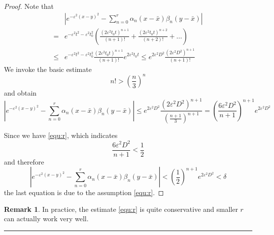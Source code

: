 \documentclass[10pt,a4paper]{article}
\theoremstyle{definition}
\newtheorem{remark}{Remark}
\begin{document}
\begin{proof}
	Note that 
	\begin{align}
		&|{e^{ - {\varepsilon ^2}{{(x - y)}^2}}} - \sum\limits_{n = 0}^r {{\alpha _n}} (x - \bar x){\beta _n}(y - \bar x)|\\
		 =&  {e^{ - {\varepsilon ^2}{t^2} - {\varepsilon ^2}t_0^2}}\left( {\frac{{{{(2{\varepsilon ^2}{t_0}t)}^{n + 1}}}}{{(n + 1)!}} + \frac{{{{(2{\varepsilon ^2}{t_0}t)}^{n + 2}}}}{{(n + 2)!}} +  \ldots } \right)\\
		\le& {e^{ - {\varepsilon ^2}{t^2} - {\varepsilon ^2}t_0^2}}\frac{{{{(2{\varepsilon ^2}{t_0}t)}^{n + 1}}}}{{(n + 1)!}}{e^{2{\varepsilon ^2}{t_0}t}} \le {e^{2{\varepsilon ^2}{D^2}}}\frac{{{{(2{\varepsilon ^2}{D^2})}^{n + 1}}}}{{(n + 1)!}}
	\end{align}
	We invoke the basic estimate
	\begin{equation}
		n!>\left( \frac{n}{3} \right)^{n}
	\end{equation} 
	and obtain
	\begin{equation}
		|{e^{ - {\varepsilon ^2}{{(x - y)}^2}}} - \sum\limits_{n = 0}^r {{\alpha _n}} (x - \bar x){\beta _n}(y - \bar x)|\leq {e^{2{\varepsilon ^2}{D^2}}}\frac{{{{(2{\varepsilon ^2}{D^2})}^{n + 1}}}}{{{{\left( {\frac{{n + 1}}{3}} \right)}^{n + 1}}}} = {\left( {\frac{{6{\varepsilon ^2}{D^2}}}{{n + 1}}} \right)^{n + 1}}{e^{2{\varepsilon ^2}{D^2}}}
	\end{equation}
	
	Since we have \cref{equ:r}, which indicates 
	\begin{equation}
		{\frac{{6{\varepsilon ^2}{D^2}}}{{n + 1}}}<\frac{1}{2}
	\end{equation}
	and therefore
	\begin{equation}
		|{e^{ - {\varepsilon ^2}{{(x - y)}^2}}} - \sum\limits_{n = 0}^r {{\alpha _n}} (x - \bar x){\beta _n}(y - \bar x)| < {\left( {\frac{1}{2}} \right)^{n + 1}}{e^{2{\varepsilon ^2}{D^2}}} < \delta 
	\end{equation}
	the last equation is due to the assumption \cref{equ:r}.
\end{proof}

\begin{remark}
	In practice, the estimate \cref{equ:r} is quite conservative and smaller $r$ can actually work very well. 
\end{remark}

\hrule
\end{document}
